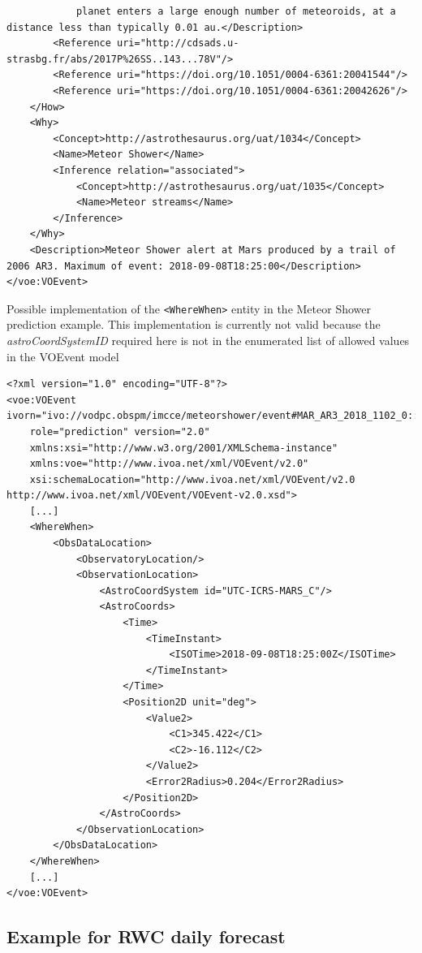 \documentclass[referee,a4paper,12pt,traditabstract]{swsc}
\begin{document}
\begin{linenumbers}
{\begin{verbatim}
            planet enters a large enough number of meteoroids, at a distance less than typically 0.01 au.</Description>
        <Reference uri="http://cdsads.u-strasbg.fr/abs/2017P%26SS..143...78V"/>
        <Reference uri="https://doi.org/10.1051/0004-6361:20041544"/>
        <Reference uri="https://doi.org/10.1051/0004-6361:20042626"/>
    </How>
    <Why>
        <Concept>http://astrothesaurus.org/uat/1034</Concept>
        <Name>Meteor Shower</Name>
        <Inference relation="associated">
            <Concept>http://astrothesaurus.org/uat/1035</Concept>
            <Name>Meteor streams</Name>
        </Inference>        
    </Why>
    <Description>Meteor Shower alert at Mars produced by a trail of 2006 AR3. Maximum of event: 2018-09-08T18:25:00</Description>
</voe:VOEvent>
\end{verbatim}
}

Possible implementation of the {\tt <WhereWhen>} entity in the Meteor Shower prediction example. This implementation is currently not valid because the \emph{astroCoordSystemID} required here is not in the enumerated list of allowed values in the VOEvent model

{\tiny 
\begin{verbatim}
<?xml version="1.0" encoding="UTF-8"?>
<voe:VOEvent ivorn="ivo://vodpc.obspm/imcce/meteorshower/event#MAR_AR3_2018_1102_0::v1.0"
    role="prediction" version="2.0"
    xmlns:xsi="http://www.w3.org/2001/XMLSchema-instance"
    xmlns:voe="http://www.ivoa.net/xml/VOEvent/v2.0"
    xsi:schemaLocation="http://www.ivoa.net/xml/VOEvent/v2.0 http://www.ivoa.net/xml/VOEvent/VOEvent-v2.0.xsd">
    [...]
    <WhereWhen>
        <ObsDataLocation>
            <ObservatoryLocation/>
            <ObservationLocation>
                <AstroCoordSystem id="UTC-ICRS-MARS_C"/>
                <AstroCoords>
                    <Time>
                        <TimeInstant>
                            <ISOTime>2018-09-08T18:25:00Z</ISOTime>
                        </TimeInstant>
                    </Time>
                    <Position2D unit="deg">
                        <Value2>
                            <C1>345.422</C1>
                            <C2>-16.112</C2>
                        </Value2>
                        <Error2Radius>0.204</Error2Radius>
                    </Position2D>
                </AstroCoords>
            </ObservationLocation>
        </ObsDataLocation>
    </WhereWhen>
    [...]
</voe:VOEvent>
\end{verbatim}
}

\subsection{Example for RWC daily forecast}
\label{appendix-xml-voevent-rwc}


\end{linenumbers}
\end{document}
